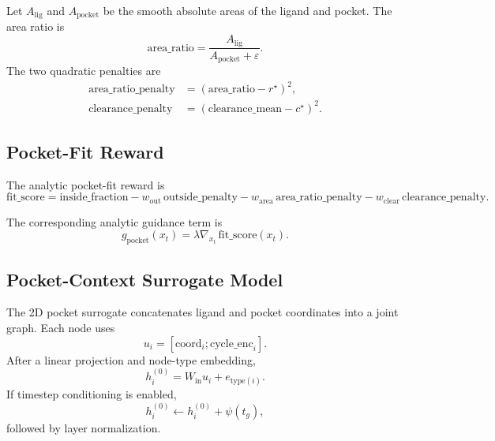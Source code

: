 \documentclass[11pt]{article}
\begin{document}
Let $A_{\mathrm{lig}}$ and $A_{\mathrm{pocket}}$ be the smooth absolute areas of the ligand and pocket. The area ratio is
\begin{equation}
\mathrm{area\_ratio}
=
\frac{A_{\mathrm{lig}}}{A_{\mathrm{pocket}} + \varepsilon}.
\end{equation}
The two quadratic penalties are
\begin{align}
\mathrm{area\_ratio\_penalty}
&=
\left(
\mathrm{area\_ratio} - r^\star
\right)^2, \\
\mathrm{clearance\_penalty}
&=
\left(
\mathrm{clearance\_mean} - c^\star
\right)^2.
\end{align}

\subsection{Pocket-Fit Reward}
The analytic pocket-fit reward is
\begin{equation}
\mathrm{fit\_score}
=
\mathrm{inside\_fraction}
- w_{\mathrm{out}}\,\mathrm{outside\_penalty}
- w_{\mathrm{area}}\,\mathrm{area\_ratio\_penalty}
- w_{\mathrm{clear}}\,\mathrm{clearance\_penalty}.
\end{equation}

The corresponding analytic guidance term is
\begin{equation}
g_{\mathrm{pocket}}(x_t)
=
\lambda \nabla_{x_t}\,\mathrm{fit\_score}(x_t).
\end{equation}

\subsection{Pocket-Context Surrogate Model}
The 2D pocket surrogate concatenates ligand and pocket coordinates into a joint graph. Each node uses
\begin{equation}
u_i = [\mathrm{coord}_i ; \mathrm{cycle\_enc}_i].
\end{equation}
After a linear projection and node-type embedding,
\begin{equation}
h_i^{(0)} = W_{\mathrm{in}} u_i + e_{\mathrm{type}(i)}.
\end{equation}
If timestep conditioning is enabled,
\begin{equation}
h_i^{(0)} \leftarrow h_i^{(0)} + \psi(t_g),
\end{equation}
followed by layer normalization.
\end{document}
